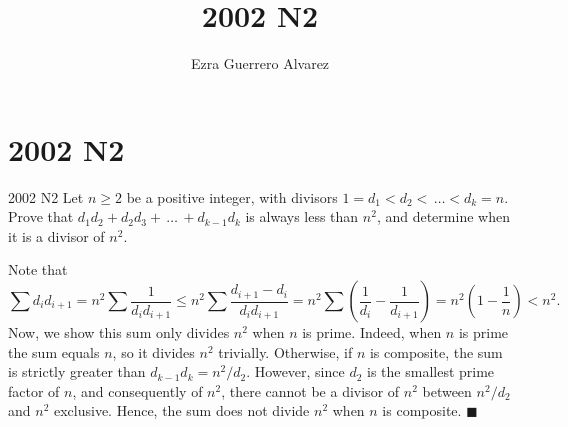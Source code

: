 \documentclass[14pt]{article}
\title{2002 N2}
\author{Ezra Guerrero Alvarez}
\begin{document}
\maketitle
	
\section*{2002 N2}

\begin{statement}{2002 N2}
	Let $n\geq2$ be a positive integer, with divisors $1=d_1<d_2<\,\ldots<d_k=n$.  Prove that $d_1d_2+d_2d_3+\,\ldots\,+d_{k-1}d_k$ is always less than $n^2$, and determine when it is a divisor of $n^2$.
\end{statement}
Note that
\[ \sum d_id_{i+1}=n^2\sum\frac1{d_id_{i+1}}\le n^2\sum\frac{d_{i+1}-d_i}{d_id_{i+1}}=n^2\sum\left(\frac1{d_i}-\frac1{d_{i+1}}\right)=n^2\left(1-\frac1n\right)<n^2. \]
Now, we show this sum only divides $n^2$ when $n$ is prime. Indeed, when $n$ is prime the sum equals $n$, so it divides $n^2$ trivially. Otherwise, if $n$ is composite, the sum is strictly greater than $d_{k-1}d_k=n^2/d_2$. However, since $d_2$ is the smallest prime factor of $n$, and consequently of $n^2$, there cannot be a divisor of $n^2$ between $n^2/d_2$ and $n^2$ exclusive. Hence, the sum does not divide $n^2$ when $n$ is composite. $\blacksquare$
	
\end{document}

